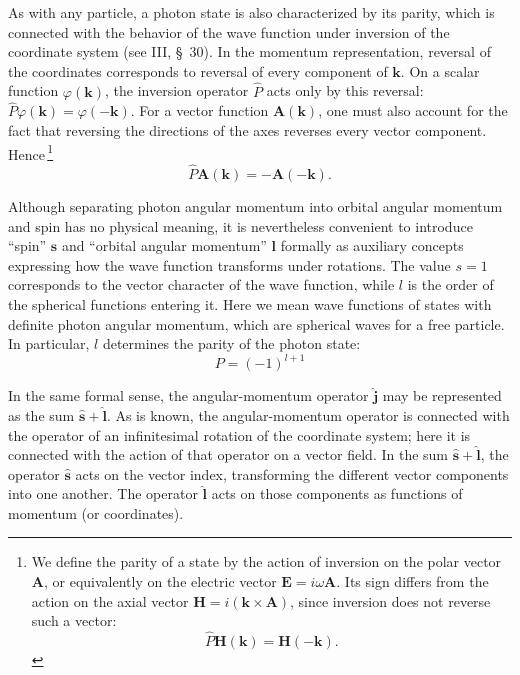As with any particle, a photon state is also characterized by its parity, which is connected with the behavior of the wave function under inversion of the coordinate system (see III, \S~30). In the momentum representation, reversal of the coordinates corresponds to reversal of every component of $\mathbf{k}$. On a scalar function $\varphi(\mathbf{k})$, the inversion operator $\widehat P$ acts only by this reversal: $\widehat P\varphi(\mathbf{k}) = \varphi(-\mathbf{k})$. For a vector function $\mathbf{A}(\mathbf{k})$, one must also account for the fact that reversing the directions of the axes reverses every vector component. Hence\,\footnote{We define the parity of a state by the action of inversion on the polar vector $\mathbf{A}$, or equivalently on the electric vector $\mathbf{E} = i\omega\mathbf{A}$. Its sign differs from the action on the axial vector $\mathbf{H} = i(\mathbf{k}\times\mathbf{A})$, since inversion does not reverse such a vector:
\[
\widehat P\mathbf{H}(\mathbf{k}) = \mathbf{H}(-\mathbf{k}).
\]}
\begin{equation}
\widehat P\mathbf{A}(\mathbf{k}) = -\mathbf{A}(-\mathbf{k}).
\tag{6.1}
\end{equation}

Although separating photon angular momentum into orbital angular momentum and spin has no physical meaning, it is nevertheless convenient to introduce ``spin'' $\mathbf{s}$ and ``orbital angular momentum'' $\mathbf{l}$ formally as auxiliary concepts expressing how the wave function transforms under rotations. The value $s = 1$ corresponds to the vector character of the wave function, while $l$ is the order of the spherical functions entering it. Here we mean wave functions of states with definite photon angular momentum, which are spherical waves for a free particle. In particular, $l$ determines the parity of the photon state:
\begin{equation}
P = (-1)^{l+1}
\tag{6.2}
\end{equation}

In the same formal sense, the angular-momentum operator $\widehat{\mathbf{j}}$ may be represented as the sum $\widehat{\mathbf{s}} + \widehat{\mathbf{l}}$. As is known, the angular-momentum operator is connected with the operator of an infinitesimal rotation of the coordinate system; here it is connected with the action of that operator on a vector field. In the sum $\widehat{\mathbf{s}} + \widehat{\mathbf{l}}$, the operator $\widehat{\mathbf{s}}$ acts on the vector index, transforming the different vector components into one another. The operator $\widehat{\mathbf{l}}$ acts on those components as functions of momentum (or coordinates).

